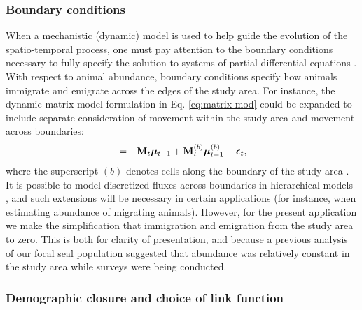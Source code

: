 \documentclass[12pt,english]{article}
\begin{document}
\begin{spacing}{1.9}
\subsubsection{Boundary conditions}

When a mechanistic (dynamic) model is used to help guide the evolution of the spatio-temporal process, one must pay attention to the boundary conditions necessary to fully specify the solution to systems of partial differential equations \citep{Haberman1998}.  With respect to animal abundance, boundary conditions specify how animals immigrate and emigrate across the edges of the study area.  For instance, the dynamic matrix model formulation in Eq. \ref{eq:matrix-mod} could be expanded to include separate consideration of movement within the study area and movement across boundaries:
\begin{eqnarray*}
[\boldsymbol{\mu}_t  | \boldsymbol{\mu}_{t-1},\boldsymbol{\theta}] & = & {\bf M}_t  \boldsymbol{\mu}_{t-1} + {\bf M}_t^{(b)} \boldsymbol{\mu}_{t-1}^{(b)} + \boldsymbol{\epsilon}_t,
\end{eqnarray*}
where the superscript $(b)$ denotes cells along the boundary of the study area \citep[][Section 6.3.2]{CressieWikle2011}.   It is possible to model discretized fluxes across boundaries in hierarchical models \citep{WikleEtAl2003b}, and such extensions will be necessary in certain applications (for instance, when estimating abundance of migrating animals).  However, for the present application we make the simplification that immigration and emigration from the study area to zero.  This is both for clarity of presentation, and because a previous analysis \citep{VerHoefEtAl2014} of our focal seal population suggested that abundance was relatively constant in the study area while surveys were being conducted.

\subsubsection{Demographic closure and choice of link function}


\end{spacing}
\end{document}
